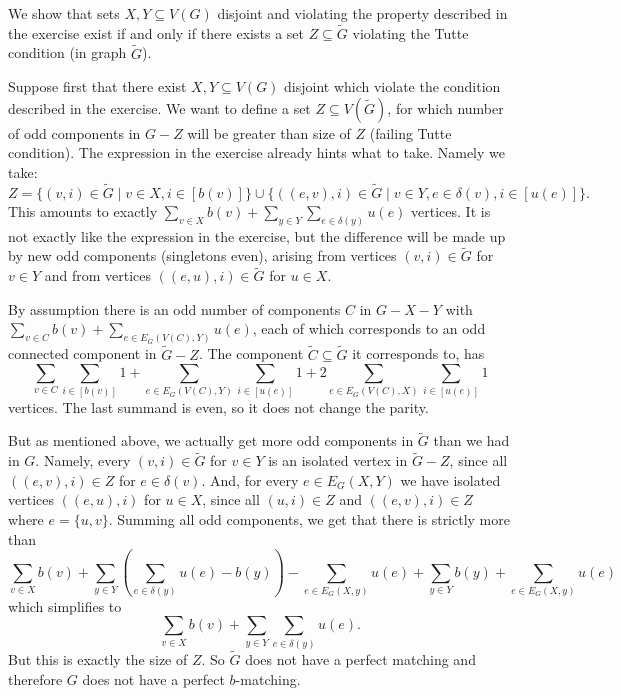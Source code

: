 \begin{exercise}{3}
    We show that sets $X, Y \subseteq V(G)$ disjoint and violating the property
    described in the exercise exist if and only if there exists a set $Z \subseteq
    \tilde{G}$ violating the Tutte condition (in graph $\tilde{G}$).

    Suppose first that there exist $X, Y \subseteq V(G)$ disjoint which violate
    the condition described in the exercise. We want to define a set $Z
    \subseteq V(\tilde{G})$, for which number of odd components in $G - Z$ will
    be greater than size of $Z$ (failing Tutte condition). The expression in the
    exercise already hints what to take. Namely we take:
    \begin{equation*}
        Z = \{ (v, i) \in \tilde{G} \mid v \in X, i \in [b(v)] \} \cup \{ ((e, v), i) \in
        \tilde{G} \mid v \in Y, e \in \delta(v), i \in [u(e)] \}.
    \end{equation*}
    This amounts to exactly $\sum_{v \in X} b(v) + \sum_{y \in Y} \sum_{e \in
    \delta(y)} u(e)$ vertices. It is not exactly like the expression in the
    exercise, but the difference will be made up by new odd components
    (singletons even), arising from vertices $(v, i) \in \tilde{G}$ for $v \in
    Y$ and from vertices $((e, u), i) \in \tilde{G}$ for $u \in X$.

    By assumption there is an odd number of components $C$ in $G - X - Y$ with
    $\sum_{v \in C} b(v) + \sum_{e \in E_G(V(C), Y)} u(e)$, each of which
    corresponds to an odd connected component in $\tilde{G} - Z$. The component
    $\tilde{C} \subseteq \tilde{G}$ it corresponds to, has
    \begin{equation*}
        \sum_{v \in C} \sum_{i \in [b(v)]} 1 + \sum_{e \in E_G(V(C), Y)} \sum_{i
        \in [u(e)]} 1 + 2 \sum_{e \in E_G(V(C), X)} \sum_{i \in [u(e)]} 1
    \end{equation*}
    vertices.
    The last summand is even, so it does not change the parity.

    But as mentioned above, we actually get more odd components in $\tilde{G}$
    than we had in $G$. Namely, every $(v, i) \in \tilde{G}$ for $v \in Y$ is an
    isolated vertex in $\tilde{G} - Z$, since all $((e, v), i) \in Z$ for $e
    \in \delta(v)$. And, for every $e \in E_G(X, Y)$ we have isolated vertices
    $((e, u), i)$ for $u \in X$, since all $(u, i) \in Z$ and $((e, v), i) \in
    Z$ where $e = \{u, v\}$. Summing all odd components, we get that
    there is strictly more than
    \begin{equation*}
        \sum_{v \in X} b(v) + \sum_{y \in Y} \left( \sum_{e \in \delta(y)} u(e)
        - b(y) \right) - \sum_{e \in E_G(X, y)} u(e) + \sum_{y \in Y} b(y) +
        \sum_{e \in E_G(X, y)} u(e)
    \end{equation*}
    which simplifies to 
    \begin{equation*}
        \sum_{v \in X} b(v) + \sum_{y \in Y} \sum_{e \in \delta(y)} u(e).
    \end{equation*}
    But this is exactly the size of $Z$. So $\tilde{G}$ does not have a perfect
    matching and therefore $G$ does not have a perfect $b$-matching.


\end{exercise}
